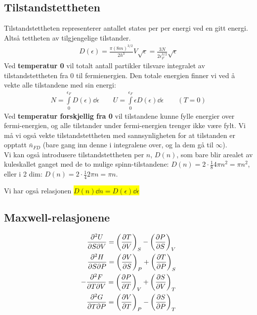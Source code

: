 \documentclass[10pt,a4paper]{article}
\renewcommand{\b}{\textbf}
\newcommand{\yl}{\colorbox{yellow}}
\begin{document}
\begin{multicols}{2}
\subsection*{Tilstandstettheten}
Tilstandstettheten representerer antallet states per per energi ved en gitt energi. Altså tettheten av tilgjengelige tilstander.
\begin{align*}
	D(\epsilon) = \frac{\pi(8m)^{3/2}}{2h^3}V\sqrt{\epsilon} = \frac{3N}{2\epsilon_F^{3/2}}\sqrt{\epsilon}
\end{align*}
Ved \b{temperatur 0} vil totalt antall partikler tilsvare integralet av tilstandstettheten fra 0 til fermienergien. Den totale energien finner vi ved å vekte alle tilstandene med sin energi:
\begin{align*}
	N = \int\limits_0^{\epsilon_F} D(\epsilon) \dd \epsilon \quad\quad
	U = \int\limits_0^{\epsilon_F} \epsilon D(\epsilon) \dd \epsilon \quad\quad (T=0)
\end{align*}
Ved \b{temperatur forskjellig fra 0} vil tilstandene kunne fylle energier over fermi-energien, og alle tilstander under fermi-energien trenger ikke være fylt. Vi må vi også vekte tilstandstettheten med sannsynligheten for at tilstanden er opptatt $\bar{n}_{FD}$ (bare gang inn denne i integralene over, og la dem gå til $\infty$).\\
Vi kan også introdusere tilstandstettheten per $n$, $D(n)$, som bare blir arealet av kuleskallet ganget med de to mulige spinn-tilstandene: $D(n)=2\cdot \frac{1}{8}4\pi n^2 = \pi n^2$, eller i 2 dim: $D(n) = 2\cdot \frac{1}{4}2\pi n = \pi n$.

Vi har også relasjonen \yl{$D(n)\dd n = D(\epsilon)\dd \epsilon$}

\subsection*{Maxwell-relasjonene}
\begin{align*}
	\pdv[2]{U}{S}{V} = \qty(\pdv{T}{V})_S - \qty(\pdv{P}{S})_V \\
	\pdv[2]{H}{S}{P} = \qty(\pdv{V}{S})_P + \qty(\pdv{T}{P})_S \\
	-\pdv[2]{F}{T}{V} = \qty(\pdv{P}{T})_V + \qty(\pdv{S}{V})_T \\
	\pdv[2]{G}{T}{P} = \qty(\pdv{V}{T})_P - \qty(\pdv{S}{P})_T \\
\end{align*}

\end{multicols}
\newpage



\end{document}
